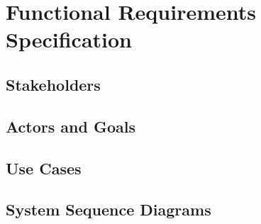 \chapter{Functional Requirements Specification}

\section{Stakeholders}

\section{Actors and Goals}

\section{Use Cases}



\section{System Sequence Diagrams}